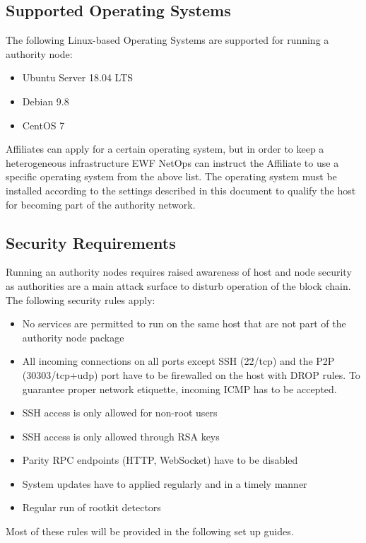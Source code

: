 \subsection{Supported Operating Systems}

The following Linux-based Operating Systems are supported for running a authority node: 

\begin{itemize}
    \item Ubuntu Server 18.04 LTS
    \item Debian 9.8
    \item CentOS 7
\end{itemize}

Affiliates can apply for a certain operating system, but in order to keep a heterogeneous infrastructure EWF NetOps can instruct the Affiliate to use a specific operating system from the above list. 
The operating system must be installed according to the settings described in this document to qualify the host for becoming part of the authority network.


\subsection{Security Requirements}

Running an authority nodes requires raised awareness of host and node security as authorities are a main attack surface to disturb operation of the block chain.
The following security rules apply:

\begin{itemize}
    \item No services are permitted to run on the same host that are not part of the authority node package
    \item All incoming connections on all ports except SSH (22/tcp) and the P2P (30303/tcp+udp) port have to be firewalled on the host with DROP rules. To guarantee proper network etiquette, incoming ICMP has to be accepted.
    \item SSH access is only allowed for non-root users
    \item SSH access is only allowed through RSA keys
    \item Parity RPC endpoints (HTTP, WebSocket) have to be disabled
    \item System updates have to applied regularly and in a timely manner
    \item Regular run of rootkit detectors
\end{itemize}

Most of these rules will be provided in the following set up guides.